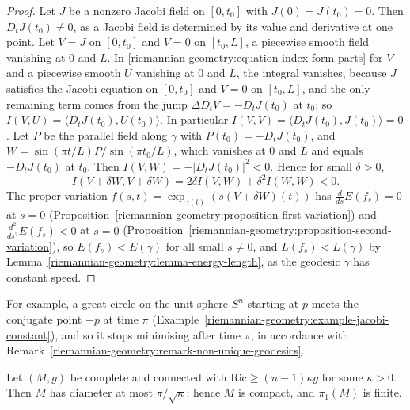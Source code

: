 \begin{proof}
Let $J$ be a nonzero Jacobi field on $[0, t_0]$ with $J(0) = J(t_0) = 0$. Then $D_tJ(t_0) \neq 0$, as a Jacobi field is determined by its value and derivative at one
point. Let $V = J$ on $[0, t_0]$ and $V = 0$ on $[t_0, L]$, a piecewise smooth field vanishing at $0$ and $L$. In \eqref{riemannian-geometry:equation-index-form-parts} for $V$ and a piecewise smooth $U$ vanishing at $0$
and $L$, the integral vanishes, because $J$ satisfies the Jacobi equation on $[0, t_0]$ and $V = 0$ on $[t_0, L]$, and the only remaining term comes from the jump
$\Delta D_tV = -D_tJ(t_0)$ at $t_0$; so $I(V, U) = \langle D_tJ(t_0), U(t_0)\rangle$. In particular $I(V, V) = \langle D_tJ(t_0), J(t_0)\rangle = 0$. Let $P$ be the parallel field
along $\gamma$ with $P(t_0) = -D_tJ(t_0)$, and $W = \sin(\pi t/L)P/\sin(\pi t_0/L)$, which vanishes at $0$ and $L$ and equals $-D_tJ(t_0)$ at $t_0$. Then
$I(V, W) = -|D_tJ(t_0)|^2 < 0$. Hence for small $\delta > 0$,
\[
I(V + \delta W, V + \delta W) = 2\delta I(V, W) + \delta^2I(W, W) < 0 .
\]
The proper variation $f(s, t) = \exp_{\gamma(t)}(s(V + \delta W)(t))$ has $\frac{d}{ds}E(f_s) = 0$ at $s = 0$ (Proposition~\ref{riemannian-geometry:proposition-first-variation})
and $\frac{d^2}{ds^2}E(f_s) < 0$ at $s = 0$ (Proposition~\ref{riemannian-geometry:proposition-second-variation}), so $E(f_s) < E(\gamma)$ for all small $s \neq 0$, and
$L(f_s) < L(\gamma)$ by Lemma~\ref{riemannian-geometry:lemma-energy-length}, as the geodesic $\gamma$ has constant speed.
\end{proof}

For example, a great circle on the unit sphere $S^n$ starting at $p$ meets the conjugate point $-p$ at time $\pi$ (Example~\ref{riemannian-geometry:example-jacobi-constant}),
and so it stops minimising after time $\pi$, in accordance with Remark~\ref{riemannian-geometry:remark-non-unique-geodesics}.

\begin{theorem}\label{riemannian-geometry:theorem-bonnet-myers}
Let $(M, g)$ be complete and connected with $\mathrm{Ric} \geq (n - 1)\kappa g$ for some $\kappa > 0$. Then $M$ has diameter at most $\pi/\sqrt\kappa$; hence $M$ is compact, and $\pi_1(M)$ is finite.
\end{theorem}

